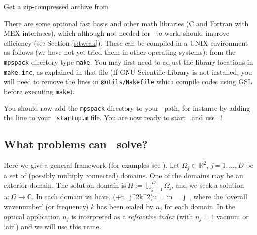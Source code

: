 \documentclass[12pt]{article}
\begin{document}
\item Get a zip-compressed archive from

\een
There are some optional fast basis and other math libraries
(C and Fortran with MEX interfaces), which although not needed for
\mpspack\ to work, should improve efficiency (see Section \ref{s:tweak}).
These can be compiled in a UNIX environment as follows
(we have not yet tried them in other operating systems):
from the {\tt mpspack} directory type {\tt make}.
You may first need to adjust the library locations in {\tt make.inc},
as explained in that file
(If GNU Scientific Library \cite{GSL} is not installed,
you will need to remove the lines in {\tt @utils/Makefile} which
compile codes using GSL before executing {\tt make}).

You should now add the {\tt mpspack}
directory to your \matlab\ path, for instance by adding the line
to your \matlab\ {\tt startup.m} file.
You are now ready to start \matlab\ and use \mpspack\ !


\subsection{What problems can \mpspack\ solve?}
\label{s:bvp}

Here we give a
general framework (for examples see \cite{mfs,polygonscatt}). 
Let $\Omega_j \subset \mathbb{R}^2$, $j=1,\ldots,D$ be a set of
(possibly multiply connected) domains. One of the domains may
be an exterior domain.
The solution domain is $\Omega:=\bigcup_{j=1}^D \Omega_j$,
and we seek a solution $u:\Omega \to\mathbb{C}$.
In each domain we have,
\be
(\Delta+n_j^2k^2)u\; = \qquad \mbox{in } \Omega_j~,
\label{e:helmj}
\ee
where the `overall wavenumber' (or frequency) $k$ has been scaled by
$n_j$ for each domain. In the optical application $n_j$ is interpreted
as a {\em refractive index} (with $n_j=1$ vacuum or `air') and we
will use this name.
\end{document}
